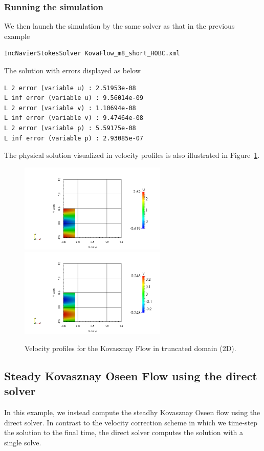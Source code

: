 \subsubsection{Running the simulation}
We then launch the simulation by the same solver as that in the previous example
\begin{lstlisting}[style=BashInputStyle]
IncNavierStokesSolver KovaFlow_m8_short_HOBC.xml
\end{lstlisting} 
 The solution with errors displayed as below
\begin{lstlisting}[style=BashInputStyle]
L 2 error (variable u) : 2.51953e-08
L inf error (variable u) : 9.56014e-09
L 2 error (variable v) : 1.10694e-08
L inf error (variable v) : 9.47464e-08
L 2 error (variable p) : 5.59175e-08
L inf error (variable p) : 2.93085e-07
\end{lstlisting}

The physical solution visualized in velocity profiles is also illustrated in 
Figure~\ref{f:incns:kovaflow2d_hobc}.

\begin{figure}
\begin{center}
\includegraphics[width=7cm]{Figures/KF2DCVP8HOBC_U.png}
\includegraphics[width=7cm]{Figures/KF2DCVP8HOBC_V.png}
\caption{Velocity profiles for the Kovasznay Flow in truncated domain (2D).}
\label{f:incns:kovaflow2d_hobc}
\end{center}
\end{figure}

\subsection{Steady Kovasznay Oseen Flow using the direct solver}
\label{s:incns:kovasznay2Ddirect}
In this example, we instead compute the steadhy Kovasznay Oseen flow
using the direct solver. In contrast to the velocity correction scheme in which
we time-step the solution to the final time, the direct solver computes the
solution with a single solve.

